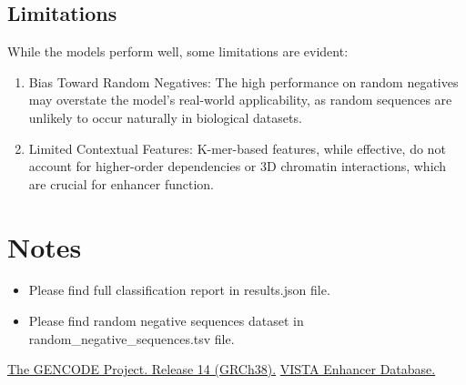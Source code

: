 \documentclass[11pt, a4paper, hidelinks]{article}
\begin{document}
\subsection{Limitations}\label{subsec:limitations}
While the models perform well, some limitations are evident:
\begin{enumerate}
    \item Bias Toward Random Negatives: The high performance on random negatives may overstate the model's real-world applicability, as random sequences are unlikely to occur naturally in biological datasets.
    \item Limited Contextual Features: K-mer-based features, while effective, do not account for higher-order dependencies or 3D chromatin interactions, which are crucial for enhancer function.
\end{enumerate}

\section{Notes}\label{sec:notes}

\begin{itemize}
    \item Please find full classification report in results.json file.
    \item Please find random negative sequences dataset in random\_negative\_sequences.tsv file.
\end{itemize}

\vspace{\baselineskip}

\begin{thebibliography}{99}
    \href{https://www.gencodegenes.org/human/release_14.html}{The GENCODE Project. Release 14 (GRCh38).}
    \href{https://enhancer.lbl.gov/vista/}{VISTA Enhancer Database.}
\end{thebibliography}
\end{document}

